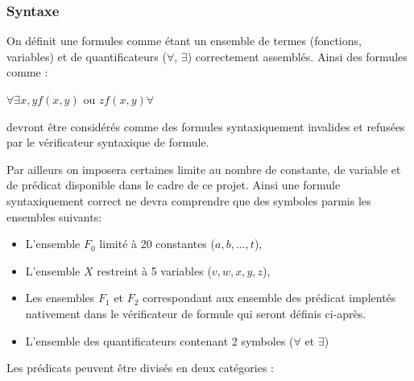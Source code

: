 \documentclass{article}
\theoremstyle{plain}
\theoremstyle{remark}
\begin{document}
\subsubsection{Syntaxe}
On définit une formules comme étant un ensemble de termes (fonctions, variables) et de quantificateurs ($\forall$, $\exists$) correctement assemblés.
\newline
Ainsi des formules comme : 
\begin{center}
$\forall \exists x,y f(x,y)$ ou $z f(x,y) \forall$ 
\end{center}
devront être considérés comme des formules syntaxiquement invalides et refusées par le vérificateur syntaxique de formule.
\newline

Par ailleurs on imposera certaines limite au nombre de constante, de variable et de prédicat disponible dans le cadre de ce projet. Ainsi une formule syntaxiquement correct ne devra comprendre que des symboles parmis les ensembles suivants:
\begin{itemize}
	\item L'ensemble $F_0$ limité à 20 constantes ($a, b, ..., t$),
	\item L'ensemble $X$ restreint à 5 variables ($v, w, x, y, z$),
	\item Les ensembles $F_1$ et $F_2$ correspondant aux ensemble des prédicat implentés nativement dans le vérificateur de formule qui seront définis ci-après.
	\item L'ensemble des quantificateurs contenant 2 symboles ($\forall$ et $\exists$)
\end{itemize}
\vspace{0.3cm}
Les prédicats peuvent être divisés en deux catégories :
\end{document}
